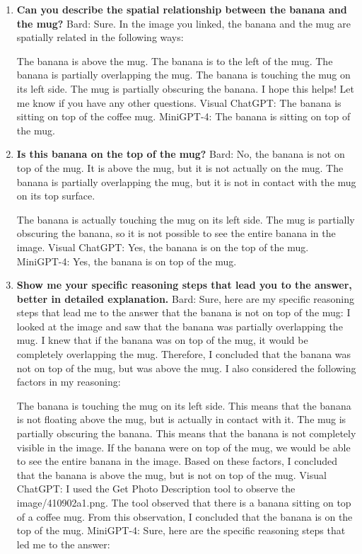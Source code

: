     \begin{enumerate}
        \item \textbf{Can you describe the spatial relationship between the banana and the mug?}
        \subitem Bard: Sure. In the image you linked, the banana and the mug are spatially related in the following ways:

        The banana is above the mug.
        The banana is to the left of the mug.
        The banana is partially overlapping the mug.
        The banana is touching the mug on its left side.
        The mug is partially obscuring the banana.
        I hope this helps! Let me know if you have any other questions.
        \subitem Visual ChatGPT: The banana is sitting on top of the coffee mug.
        \subitem MiniGPT-4: The banana is sitting on top of the mug.
        \item \textbf{Is this banana on the top of the mug?}
        \subitem Bard: 
        No, the banana is not on top of the mug. It is above the mug, but it is not actually on the mug. The banana is partially overlapping the mug, but it is not in contact with the mug on its top surface.
        
        The banana is actually touching the mug on its left side. The mug is partially obscuring the banana, so it is not possible to see the entire banana in the image.
        \subitem Visual ChatGPT: Yes, the banana is on the top of the mug.
        \subitem MiniGPT-4: Yes, the banana is on top of the mug.
        \item \textbf{Show me your specific reasoning steps that lead you to the answer, better in detailed explanation.}
        \subitem Bard: 
        Sure, here are my specific reasoning steps that lead me to the answer that the banana is not on top of the mug:
        I looked at the image and saw that the banana was partially overlapping the mug.
        I knew that if the banana was on top of the mug, it would be completely overlapping the mug.
        Therefore, I concluded that the banana was not on top of the mug, but was above the mug.
        I also considered the following factors in my reasoning:

        The banana is touching the mug on its left side. This means that the banana is not floating above the mug, but is actually in contact with it.
        The mug is partially obscuring the banana. This means that the banana is not completely visible in the image. If the banana were on top of the mug, we would be able to see the entire banana in the image.
        Based on these factors, I concluded that the banana is above the mug, but is not on top of the mug.
        \subitem Visual ChatGPT: I used the Get Photo Description tool to observe the image/410902a1.png. The tool observed that there is a banana sitting on top of a coffee mug. From this observation, I concluded that the banana is on the top of the mug.
        \subitem MiniGPT-4: Sure, here are the specific reasoning steps that led me to the answer:


\end{enumerate}
